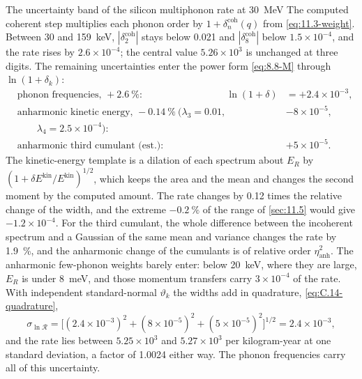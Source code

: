 \begin{workedexample}{The uncertainty band of the silicon multiphonon rate at \SI{30}{MeV}}
The computed coherent step multiplies each phonon order by $1 + \delta^{\mathrm{coh}}_n(q)$ from \cref{eq:11.3-weight}. Between 30 and \SI{159}{keV}, $|\delta^{\mathrm{coh}}_2|$ stays below 0.021 and $|\delta^{\mathrm{coh}}_8|$ below $1.5\times10^{-4}$, and the rate rises by $2.6\times10^{-4}$; the central value $5.26\times10^3$ is unchanged at three digits. The remaining uncertainties enter the power form \cref{eq:8.8-M} through $\ln(1 + \delta_k)$:
\begin{equation*}
  \begin{aligned}
  &\text{phonon frequencies, } +\SI{2.6}{\percent}: & \ln(1 + \delta) &= +2.4\times10^{-3}, \\
  &\text{anharmonic kinetic energy, } -\SI{0.14}{\percent}\ (\lambda_3 = 0.01, & &-8\times10^{-5}, \\
  &\qquad\lambda_4 = 2.5\times10^{-4}): & & \\
  &\text{anharmonic third cumulant (est.)}: & &+5\times10^{-5}.
  \end{aligned}
\end{equation*}
The kinetic-energy template is a dilation of each spectrum about $E_R$ by $(1 + \delta E^{\mathrm{kin}}/E^{\mathrm{kin}})^{1/2}$, which keeps the area and the mean and changes the second moment by the computed amount. The rate changes by 0.12 times the relative change of the width, and the extreme $-\SI{0.2}{\percent}$ of the range of \cref{sec:11.5} would give $-1.2\times10^{-4}$. For the third cumulant, the whole difference between the incoherent spectrum and a Gaussian of the same mean and variance changes the rate by \SI{1.9}{\percent}, and the anharmonic change of the cumulants is of relative order $\eta_{\mathrm{anh}}^2$. The anharmonic few-phonon weights barely enter: below \SI{20}{keV}, where they are large, $E_R$ is under \SI{8}{meV}, and those momentum transfers carry $3\times10^{-4}$ of the rate. With independent standard-normal $\vartheta_k$ the widths add in quadrature, \cref{eq:C.14-quadrature},
\begin{equation*}
  \sigma_{\ln\mathcal{R}} = \bigl[(2.4\times10^{-3})^2 + (8\times10^{-5})^2 + (5\times10^{-5})^2\bigr]^{1/2} = 2.4\times10^{-3} ,
\end{equation*}
and the rate lies between $5.25\times10^3$ and $5.27\times10^3$ per kilogram-year at one standard deviation, a factor of 1.0024 either way. The phonon frequencies carry all of this uncertainty.


\end{workedexample}
